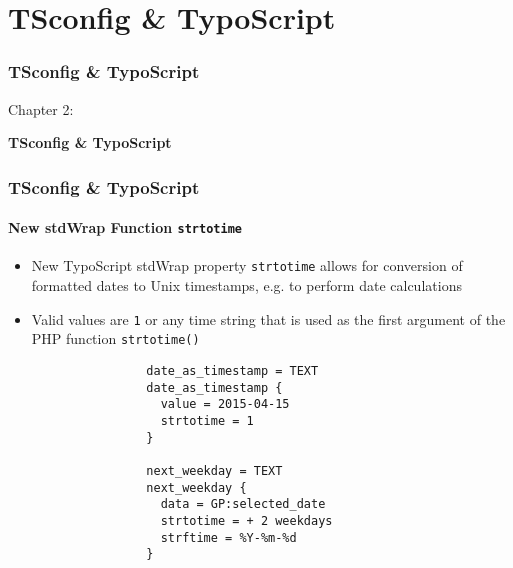 %

\section{TSconfig \& TypoScript}
\begin{frame}[fragile]
	\frametitle{TSconfig \& TypoScript}

	\begin{center}\huge{Chapter 2:}\end{center}
	\begin{center}\huge{\color{typo3darkgrey}\textbf{TSconfig \& TypoScript}}\end{center}

\end{frame}

\begin{frame}[fragile]
	\frametitle{TSconfig \& TypoScript}
	\framesubtitle{New stdWrap Function \texttt{strtotime}}

	\begin{itemize}

		\item New TypoScript stdWrap property \texttt{strtotime} allows for conversion of
			formatted dates to Unix timestamps, e.g. to perform date calculations

		\item Valid values are \texttt{1} or any time string that is used as the first
			argument of the PHP function \texttt{strtotime()}

			\begin{lstlisting}
				date_as_timestamp = TEXT
				date_as_timestamp {
				  value = 2015-04-15
				  strtotime = 1
				}

				next_weekday = TEXT
				next_weekday {
				  data = GP:selected_date
				  strtotime = + 2 weekdays
				  strftime = %Y-%m-%d
				}
			\end{lstlisting}

	\end{itemize}

\end{frame}

